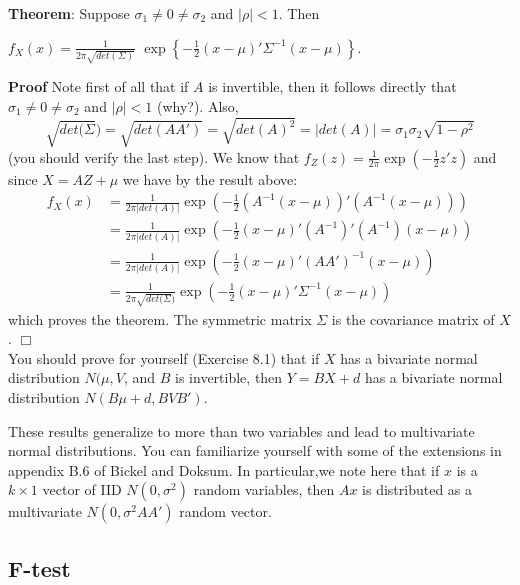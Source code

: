 \documentclass[12pt,oneside]{article}
\begin{document}
\textbf{Theorem}: Suppose $\sigma_1 \neq 0 \neq \sigma_2$ and $|\rho|<
1$. Then \\
\begin{center}
$f_X (x) = \frac{1}{2 \pi \sqrt{det(\Sigma)}}$ $\exp \left\{-
  \frac{1}{2} (x - \mu)' \Sigma^{-1} (x - \mu) \right\}$.
\end{center}

\textbf{Proof}
Note first of all that if $A$ is invertible, then it follows directly
that $\sigma_1 \neq 0 \neq \sigma_2$ and $|\rho| < 1$ (why?). Also,
$$\sqrt{det(\Sigma}) = \sqrt{det(AA')} = \sqrt{det(A) ^2} = |det(A)| =
\sigma_1 \sigma_2 \sqrt{1 - \rho^2}$$ (you should verify the last
step). We know that $f_Z(z) = \frac{1}{2 \pi} \exp \left( - \frac{1}{2}
  z'z \right)$ and since $X = AZ + \mu$ we have by the result above:
\begin{align*}
f_X(x) &= \frac{1}{2 \pi |det(A)|} \exp \left( - \frac{1}{2} (A^{-1}(x -
    \mu))'(A^{-1}(x- \mu)) \right) \\
    &= \frac{1}{2 \pi |det(A)|} \exp
    \left( - \frac{1}{2} (x - \mu)'(A^{-1})'(A^{-1})(x- \mu) \right) \\
   &=\frac{1}{2 \pi |det(A)|} \exp \left( - \frac{1}{2} (x -
    \mu)'(AA')^{-1}(x- \mu) \right) \\
 &= \frac{1}{2 \pi \sqrt{det(\Sigma})} \exp
    \left( - \frac{1}{2} (x - \mu)'\Sigma^{-1}(x- \mu) \right)
\end{align*}
which proves the theorem. The symmetric matrix $\Sigma$ is the
covariance matrix of $X$. $\Box$ \\

You should prove for yourself (Exercise 8.1) that if $X$ has a bivariate normal
distribution $N(\mu, V$, and $B$ is invertible, then $Y = BX + d$ has
a bivariate normal distribution $N(B\mu + d, BVB')$.


These results generalize to more than two variables and lead to
multivariate normal distributions. You can familiarize yourself
with some of the extensions in appendix B.6 of Bickel and Doksum. In
particular,we note here that  if $x$ is a $k \times 1$ vector of IID
$N(0, \sigma^2)$ random variables, then $Ax$ is distributed as a
multivariate $N(0, \sigma^2 AA')$ random vector.

\subsection{F-test}
\end{document}
